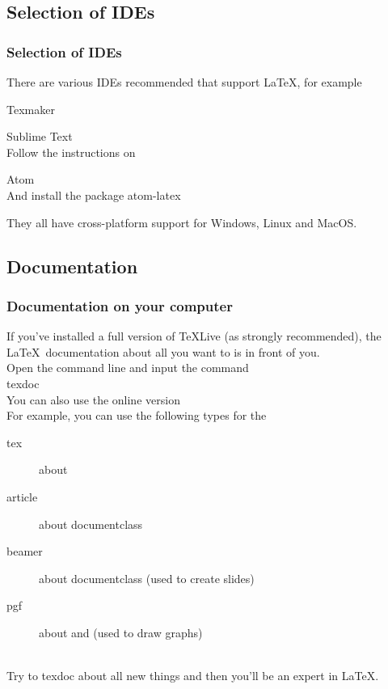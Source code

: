 \subsection{Selection of IDEs}

\begin{frame}
	\frametitle{Selection of IDEs}
	There are various IDEs recommended that support \LaTeX , for example
	\begin{block}{Texmaker}
	\end{block}
	\begin{block}{Sublime Text}
		 \\[0.5em]
		Follow the instructions on 
	\end{block}
	\begin{block}{Atom}
		 \\[0.5em]
		And install the package \alert{atom-latex}
	\end{block}
	They all have cross-platform support for Windows, Linux and MacOS.
\end{frame}

\subsection{Documentation}

\begin{frame}
	\frametitle{Documentation on your computer}
	If you've installed a full version of TeXLive (as strongly recommended), the \LaTeX\ documentation about all you want to is in front of you.\\[0.5em]
	Open the command line and input the command\\
	\alert{texdoc} \\[0.5em]
	You can also use the online version \\[0.5em]
	For example, you can use the following types for the 
	\begin{description}
		\item[tex] 		about \\
		\item[article] 	about documentclass \\
		\item[beamer] 	about documentclass  (used to create slides)\\
		\item[pgf]		about  and  (used to draw graphs)\\
	\end{description}
	\ \\[-0.5em]
	Try to \alert{texdoc} about all new things and then you'll be an expert in \LaTeX.
\end{frame}

